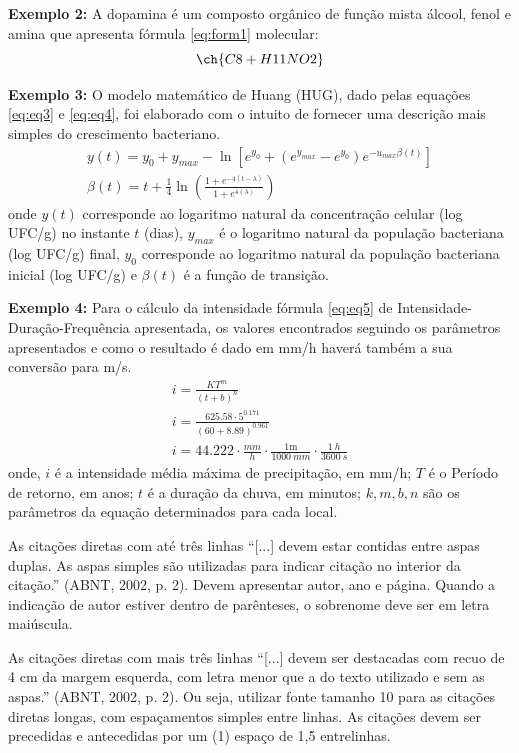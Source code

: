 \textbf{Exemplo 2:}
A dopamina é um composto orgânico de função mista álcool, fenol e amina que apresenta fórmula \eqref{eq:form1} molecular:
\begin{equation} \label{eq:form1}
\ch{C8 + H11NO2} 
\end{equation}

\textbf{Exemplo 3:}
O modelo matemático de Huang (HUG), dado pelas equações \eqref{eq:eq3} e \eqref{eq:eq4}, foi elaborado com o intuito de fornecer uma descrição mais simples do crescimento bacteriano.
\begin{gather} 
	y(t) = y_0 + y_{max} -\ln{[e^{y_0}  + (e^{y_{max}} -e^{y_0} )  e^{-u_{max}\beta(t)} ]}   \label{eq:eq3}  \\
	\beta(t) = t + \frac{1}{4}\ln\left( \frac{1+ e^{-4(t-\lambda)} }{1+ e^{4(\lambda)} }\right) \label{eq:eq4}
\end{gather}
\noindent onde $y(t)$ corresponde ao logaritmo natural da concentração celular (log UFC/g) no instante $t$ (dias), $y_{max}$ é o logaritmo natural da população bacteriana (log UFC/g) final, $y_0$ corresponde ao logaritmo natural da população bacteriana inicial (log UFC/g) e $\beta(t)$ é a função de transição.

\textbf{Exemplo 4:}
Para o cálculo da intensidade fórmula \eqref{eq:eq5} de Intensidade-Duração-Frequência apresentada, os valores encontrados seguindo os parâmetros apresentados e como o resultado é dado em mm/h haverá também a sua conversão para m/s.
\begin{gather} 
	i = \frac{K T^m}{(t+b)^n}   \label{eq:eq5}  \\[2ex]
		i = \frac{\num{625.58} \cdot 5^{\num{0.171}}  }{(60+\num{8.89})^{\num{0.961}}} \\[2ex]
		i = \num{44.222} \cdot \frac{\si{mm}}{\si{h}} \cdot \frac{1\mathrm{m}}{\SI{1000}{mm}} \cdot \frac{\SI{1}{h}}{\SI{3600}{s}} 	
\end{gather}
\noindent onde, $i$ é a intensidade média máxima de precipitação, em mm/h; $T$ é o Período de retorno, em anos; $t$ é a duração da chuva, em minutos; $k,m,b,n$ são os parâmetros da equação determinados para cada local.


As citações diretas com até três linhas ``[...] devem estar contidas entre aspas duplas. As aspas simples são utilizadas para indicar citação no interior da citação.'' (ABNT, 2002, p. 2). Devem apresentar autor, ano e página. Quando a indicação de autor estiver dentro de parênteses, o sobrenome deve ser em letra maiúscula. 


As citações diretas com mais três linhas ``[...] devem ser destacadas com recuo de 4 cm da margem esquerda, com letra menor que a do texto utilizado e sem as aspas.'' (ABNT, 2002, p. 2). Ou seja, utilizar fonte tamanho 10 para as citações diretas longas, com espaçamentos simples entre linhas. As citações devem ser precedidas e antecedidas por um (1) espaço de 1,5 entrelinhas. 


